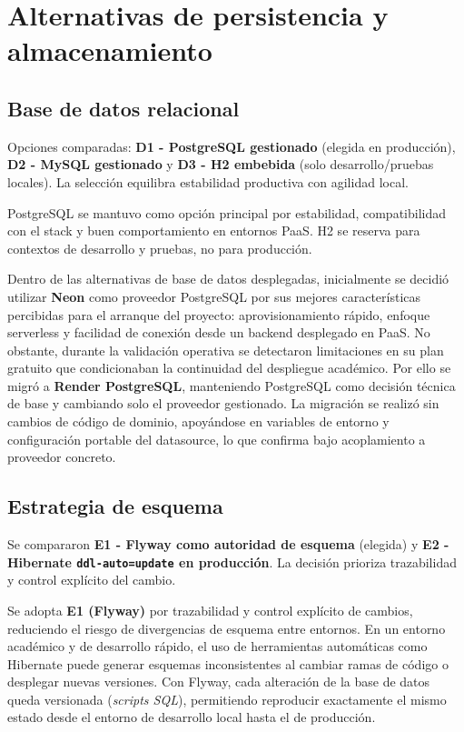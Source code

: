 \FloatBarrier
\section{Alternativas de persistencia y almacenamiento}

\subsection{Base de datos relacional}

Opciones comparadas: \textbf{D1 - PostgreSQL gestionado} (elegida en producci\'on), \textbf{D2 - MySQL gestionado} y \textbf{D3 - H2 embebida} (solo desarrollo/pruebas locales). La selecci\'on equilibra estabilidad productiva con agilidad local.

PostgreSQL se mantuvo como opci\'on principal por estabilidad, compatibilidad
con el stack y buen comportamiento en entornos PaaS.
H2 se reserva para contextos de desarrollo y pruebas, no para producci\'on.

Dentro de las alternativas de base de datos desplegadas,
inicialmente se decidi\'o utilizar \textbf{Neon} como proveedor PostgreSQL
por sus mejores caracter\'isticas percibidas para el arranque del proyecto:
aprovisionamiento r\'apido, enfoque serverless y facilidad de conexi\'on
desde un backend desplegado en PaaS.
No obstante, durante la validaci\'on operativa se detectaron limitaciones
en su plan gratuito que condicionaban la continuidad del despliegue acad\'emico.
Por ello se migr\'o a \textbf{Render PostgreSQL},
manteniendo PostgreSQL como decisi\'on t\'ecnica de base y cambiando solo
el proveedor gestionado.
La migraci\'on se realiz\'o sin cambios de c\'odigo de dominio,
apoy\'andose en variables de entorno y configuraci\'on portable del datasource,
lo que confirma bajo acoplamiento a proveedor concreto.

\subsection{Estrategia de esquema}

Se compararon \textbf{E1 - Flyway como autoridad de esquema} (elegida) y \textbf{E2 - Hibernate \texttt{ddl-auto=update} en producci\'on}. La decisi\'on prioriza trazabilidad y control expl\'icito del cambio.

Se adopta \textbf{E1 (Flyway)} por trazabilidad y control expl\'icito de cambios, reduciendo el riesgo de divergencias de esquema entre entornos. En un entorno acad\'emico y de desarrollo r\'apido, el uso de herramientas autom\'aticas como Hibernate puede generar esquemas inconsistentes al cambiar ramas de c\'odigo o desplegar nuevas versiones. Con Flyway, cada alteraci\'on de la base de datos queda versionada (\emph{scripts SQL}), permitiendo reproducir exactamente el mismo estado desde el entorno de desarrollo local hasta el de producci\'on.

